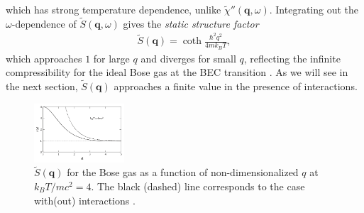 \documentclass[reprint,
nofootinbib,
amsmath,amssymb,
aps]{revtex4-1}
\newcommand{\f}[2]{\frac{#1}{#2}}
\begin{document}
which has strong temperature dependence, unlike $\widetilde{\chi}''(\mathbf{q},\omega)$.  Integrating out the $\omega$-dependence of $\widetilde{S}(\mathbf{q},\omega)$ gives the \textit{static structure factor}
\begin{align*}
\widetilde{S}(\mathbf{q}) = \coth \f{\hbar^2 q^2}{4mk_BT},
\end{align*}
which approaches $1$ for large $q$ and diverges for small $q$, reflecting the infinite compressibility for the ideal Bose gas at the BEC transition \cite{kardar2007statistical}. As we will see in the next section, $\widetilde{S}(\mathbf{q})$ approaches a finite value in the presence of interactions. 

\begin{figure}[!htb]
\label{fig:ideal}
\centering
\includegraphics[width=0.3\textwidth]{figures/ideal.png}
\caption{$\widetilde{S}(\mathbf{q})$ for the Bose gas as a function of non-dimensionalized $q$ at $k_BT / mc^2 = 4$. The black (dashed) line corresponds to the case with(out) interactions \cite{pitaevskii2016bose}.}
\end{figure}
\end{document}
